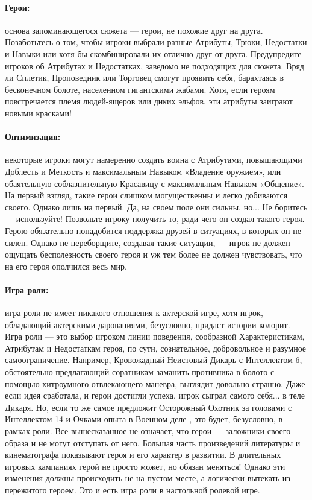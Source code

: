 \paragraph{Герои:} основа запоминающегося сюжета — герои, не похожие друг на друга. Позаботьтесь о том, чтобы игроки выбрали разные Атрибуты, Трюки, Недостатки и Навыки или хотя бы скомбинировали их отлично друг от друга. Предупредите игроков об Атрибутах и Недостатках, заведомо не подходящих для сюжета. Вряд ли Сплетик, Проповедник или Торговец смогут проявить себя, барахтаясь в бесконечном болоте, населенном гигантскими жабами. Хотя, если героям повстречается племя людей-ящеров или диких эльфов, эти атрибуты заиграют новыми красками!
\paragraph{Оптимизация:} некоторые игроки могут намеренно создать воина с Атрибутами, повышающими Доблесть и Меткость и максимальным Навыком «Владение оружием», или обаятельную соблазнительную Красавицу с максимальным Навыком «Общение». На первый взгляд, такие герои слишком могущественны и легко добиваются своего. Однако лишь на первый. Да, на своем поле они сильны, но... Не боритесь — используйте! Позвольте игроку получить то, ради чего он создал такого героя. Герою обязательно понадобится поддержка друзей в ситуациях, в которых он не силен. Однако не переборщите, создавая такие ситуации, — игрок не должен ощущать бесполезность своего героя и уж тем более не должен чувствовать, что на его героя ополчился весь мир.
\paragraph{Игра роли:} игра роли не имеет никакого отношения к актерской игре, хотя игрок, обладающий актерскими дарованиями, безусловно, придаст истории колорит. Игра роли — это выбор игроком линии поведения, сообразной Характеристикам, Атрибутам и Недостаткам героя, по сути, сознательное, добровольное и разумное самоограничение. Например, Кровожадный Неистовый Дикарь с Интеллектом 6, обстоятельно предлагающий соратникам заманить противника в болото с помощью хитроумного отвлекающего маневра, выглядит довольно странно. Даже если идея сработала, и герои достигли успеха, игрок сыграл самого себя... в теле Дикаря.
Но, если то же самое предложит Осторожный Охотник за головами с Интеллектом 14 и Очками опыта в Военном деле , это будет, безусловно, в рамках роли. Все вышесказанное не означает, что герои — заложники своего образа и не могут отступать от него. Большая часть произведений литературы и кинематографа показывают героя и его характер в развитии. В длительных игровых кампаниях герой не просто может, но обязан меняться! Однако эти изменения должны происходить не на пустом месте, а логически вытекать из пережитого героем. Это и есть игра роли в настольной ролевой игре.
